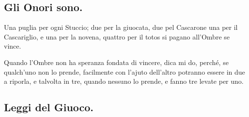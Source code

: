 \documentclass[11pt,a6paper]{article}
\begin{document}
\subsection{Gli Onori sono.}

Una puglia per ogni Stuccio; due per la
giuocata, due pel Cascarone una per il
Cascariglio, e una per la novena, quattro per il
totos si pagano all'Ombre se vince.

Quando l'Ombre non ha speranza fondata
di vincere, dica mi do, perché, se qualch'uno
non lo prende, facilmente con l'ajuto
dell'altro potranno essere in due a riporla, e
talvolta in tre, quando nessuno lo prende, e
fanno tre levate per uno.

\subsection{Leggi del Giuoco.}
\end{document}

